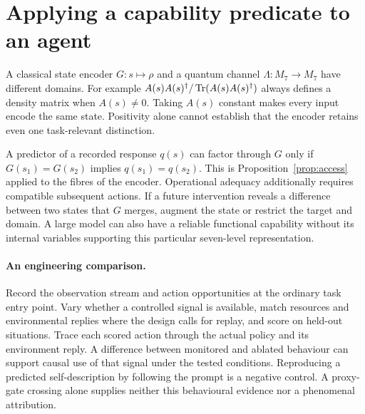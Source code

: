 \section{Applying a capability predicate to an agent}
A classical state encoder $G:s\mapsto\rho$ and a quantum channel $\Lambda:M_7\to M_7$ have different domains. For example $A(s)A(s)^\dagger/\operatorname{Tr}(A(s)A(s)^\dagger)$ always defines a density matrix when $A(s)\ne0$. Taking $A(s)$ constant makes every input encode the same state. Positivity alone cannot establish that the encoder retains even one task-relevant distinction.

A predictor of a recorded response $q(s)$ can factor through $G$ only if $G(s_1)=G(s_2)$ implies $q(s_1)=q(s_2)$. This is Proposition~\ref{prop:access} applied to the fibres of the encoder. Operational adequacy additionally requires compatible subsequent actions. If a future intervention reveals a difference between two states that $G$ merges, augment the state or restrict the target and domain. A large model can also have a reliable functional capability without its internal variables supporting this particular seven-level representation.

\paragraph{An engineering comparison.}
Record the observation stream and action opportunities at the ordinary task entry point. Vary whether a controlled signal is available, match resources and environmental replies where the design calls for replay, and score on held-out situations. Trace each scored action through the actual policy and its environment reply. A difference between monitored and ablated behaviour can support causal use of that signal under the tested conditions. Reproducing a predicted self-description by following the prompt is a negative control. A proxy-gate crossing alone supplies neither this behavioural evidence nor a phenomenal attribution.

